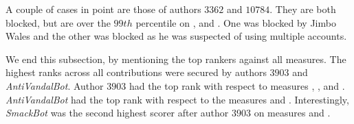 A couple of cases in point are those of authors $3362$ and
$10784$.
They are both blocked, but are over the $99th$ percentile on
\editlong, \textlong and \punish.
One was blocked by Jimbo Wales and the other was blocked as he
was suspected of using multiple accounts.

We end this subsection, by mentioning the top rankers against all
measures.
The highest ranks across all contributions were secured by
authors $3903$ and \textit{AntiVandalBot}.
Author $3903$ had the top rank with respect to measures
\textonly, \textlong, \punish and \tenrevs.
\textit{AntiVandalBot} had the top rank with respect to the measures
\editlong and \editonly.
Interestingly, \textit{SmackBot} was the second highest scorer after
author $3903$ on measures \textlong and \punish.

